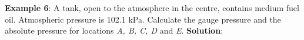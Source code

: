 \documentclass[10pt]{amsart}
\begin{document}
\begin{minipage}[t]{0.45\textwidth}
	\raggedright	
	\textbf{Example 6}:
	A tank, open to the atmosphere in the centre, contains medium fuel
	oil. Atmospheric pressure is 102.1 kPa. Calculate the gauge pressure
	and the absolute pressure for locations \emph{A, B, C, D} and \emph{E}.
	\parb
	\textbf{Solution}:
	\parb

%	
%
%				
%	
%		

\end{minipage}
\end{document}
